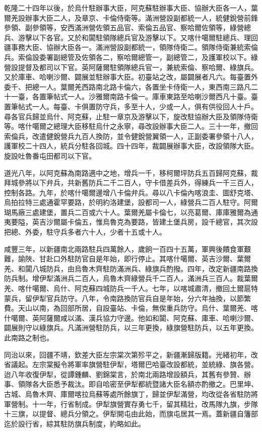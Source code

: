 \begin{pinyinscope}
乾隆二十四年以後，於烏什駐辦事大臣，阿克蘇駐辦事大臣、協辦大臣各一人，葉爾羌設辦事大臣二人，及章京、卡倫侍衛等。滿洲營設副都統一人，統健銳營前鋒參領、副參領等，安西滿洲營佐領五品官、索倫五品官、察哈爾佐領等，綠營總兵、游擊以下各官。又於和闐駐領隊總兵官及游擊以下。又喀什噶爾駐總兵、理回疆事務大臣、協辦大臣各一。滿洲營設副都統一，領隊侍衛二。領隊侍衛兼統索倫兵。索倫設委署副總管及佐領各二，察哈爾總管一，副總管二，及護軍校以下。綠營設提督及都司以下官。英阿薩爾駐領隊總兵官一，兼統索倫、察哈爾、綠旗兵。又於庫車、哈喇沙爾、闢展並駐辦事大臣。初臺站之改，屬闢展者凡六。每臺置外委千、把總一人。葉爾羌西路南北路卡倫六，各置坐卡侍衛一人，東西南三路凡二十一臺，各置筆帖式一人。沙雅爾南路卡倫一。庫車東路至哈喇沙爾西凡十臺。臺置筆帖式一人。每臺、卡俱置防守兵，多至十人，少或一人，俱有供役回人十戶。尋各官兵歸並烏什、阿克蘇，止駐一章京及游擊以下，旋改駐協辦大臣及領隊侍衛等。喀什噶爾之總理大臣移駐烏什之永寧，尋改設辦事大臣二人。三十一年，撤回索倫兵，改遣健銳營兵九百人換防，並令健銳營翼領一人，正副委署參領十八人，護軍校二十四人，統兵分駐各回城。四十四年，裁闢展辦事大臣，改設領隊大臣。旋設吐魯番屯田都司以下官。

道光八年，以阿克蘇為南路適中之地，增兵一千，移柯爾坪防兵五百歸阿克蘇，裁拜城參將以下弁兵，共新舊防兵二千二百人，守卡借差兵外，得練兵一千三百人，控制各路。九年，於喀什噶爾邊增八卡倫弁兵。尋以八卡倫內喀浪圭、圖舒克塔、烏拍拉特三處通霍罕要路，於明約洛建堡，設都司一人，綠營兵二百人駐守。阿爾瑚馬廠三處建堡，置兵二百或六十人。葉爾羌屬卡倫七，以亮葛爾、庫庫雅爾為通夷要隘，英吉沙爾屬卡倫五，惟烏魯克為要路，皆建土堡兵房，設千總官，其次設把總、外委，駐守兵多者六十人，少者十五或十人。

咸豐三年，以新疆南北兩路駐兵四萬餘人，歲餉一百四十五萬，軍興後饋食軍艱難，諭陜、甘赴口外駐防官自是年始，即行停止。其喀什噶爾、英吉沙爾、葉爾羌、和闐八城防兵，由烏魯木齊駐防滿洲兵、綠旗兵酌撥。四年，改定新疆南路換防兵制。增伊犁滿洲兵二百人，烏魯木齊綠營兵千二百人，滿洲兵三百人。裁葉爾羌、喀什噶爾、烏什、阿克蘇四城防兵一千人。七年，以喀城肅清，撤回土爾扈特蒙兵，留伊犁官兵防守。八年，令南路換防官兵自是年始，分六年抽換，以節繁費。天山以南，為回部所居，自設臺站、卡倫，無俟重兵防守。烏什、葉爾羌、喀什噶爾、英阿薩爾咸以滿、漢兵協力守邊。他如和闐、阿克蘇、庫車、哈喇沙爾、闢展則守以綠旗兵。凡滿洲營駐防兵，以三年更換，綠旗營駐防兵，以五年更換。此南路之制也。

同治以來，回疆不靖，欽差大臣左宗棠次第殄平之，新疆漸歸版籍。光緒初年，改省議起。左宗棠擬令將軍率旗營駐伊犁，塔爾巴哈臺改設都統，並統綠、旗各營。迨八年收復伊犁，從譚鍾麟、劉錦棠言，於南北兩路增設額兵，其舊有參贊、辦事、領隊各大臣悉予裁汰。即自哈密至伊犁都統暨諸大臣名額亦酌撤之。巴里坤、古城、烏魯木齊、庫爾喀拉烏蘇等處所餘旗丁，歸並伊犁滿營，均改從各省駐防將軍營制。十一年，行省制成。伊犁旗營實存勇七千，留其精壯，改馬隊九旗，步隊十三旗，以提督、總兵分領之。伊犁開屯由此始，而旗屯居其一焉。蓋新疆自籓部迄於設行省，綜其駐防旗兵制度，約略如此。


\end{pinyinscope}
